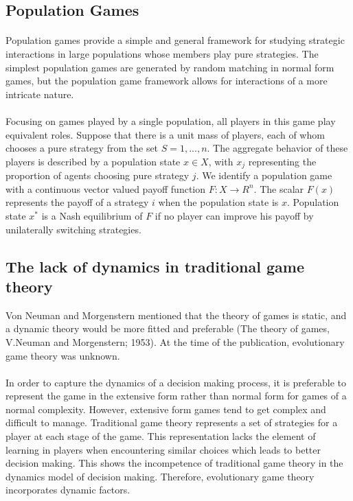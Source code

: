 \subsection{Population Games}
\paragraph{}Population games provide a simple and general framework for studying strategic interactions in large populations whose members play pure strategies. The simplest population games are generated by random matching in normal form games, but the population game framework allows for interactions of a more intricate nature.
\paragraph{}Focusing on games played by a single population, all players in this game play equivalent roles. Suppose that there is a unit mass of players, each of whom chooses a pure strategy from the set
 $S = {1, ... , n}$. The aggregate behavior of these players is described by a population state $x \in X$, with $x_j$ representing the proportion of agents choosing pure strategy $j$. We identify a population game with a continuous vector valued payoff function $ F:X \rightarrow R^n$. The scalar $F(x)$ represents the payoff of a strategy $i$ when the population state is $x$. Population state $x^*$ is a Nash equilibrium of $F$ if no player can improve his payoff by unilaterally switching strategies.
\subsection{The lack of dynamics in traditional game theory}
Von Neuman and Morgenstern mentioned that the theory of games is static, and a dynamic theory would be more fitted and preferable (The theory of games, V.Neuman and Morgenstern; 1953). At the time of the publication, evolutionary game theory was unknown.
\paragraph{}
In order to capture the dynamics of a decision making process, it is preferable to represent the game in the extensive form rather than normal form for games of a normal complexity. However, extensive form games tend to get complex and difficult to manage. Traditional game theory represents a set of strategies for a player at each stage of the game. This representation lacks the element of learning in players when encountering similar choices which leads to better decision making. This shows the incompetence of traditional game theory in the dynamics model of decision making. Therefore, evolutionary game theory incorporates dynamic factors.
